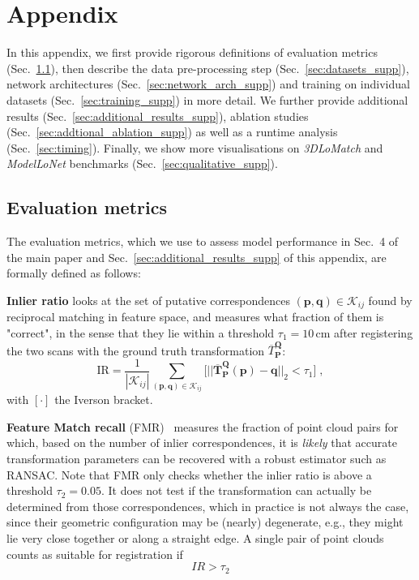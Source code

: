 \section{Appendix}
In this appendix, we first provide rigorous definitions of evaluation metrics (Sec.~\ref{sec:evaluation_metrics_supp}), then describe the data pre-processing step (Sec.~\ref{sec:datasets_supp}), network architectures (Sec.~\ref{sec:network_arch_supp}) and training on individual datasets (Sec.~\ref{sec:training_supp}) in more detail. We further provide additional results (Sec.~\ref{sec:additional_results_supp}), ablation studies (Sec.~\ref{sec:addtional_ablation_supp}) as well as a runtime analysis (Sec.~\ref{sec:timing}). Finally, we show more visualisations on \emph{3DLoMatch} and \emph{ModelLoNet} benchmarks (Sec.~\ref{sec:qualitative_supp}). 


\subsection{Evaluation metrics}
\label{sec:evaluation_metrics_supp}
The evaluation metrics, which we use to assess model performance in Sec.~4 of the main paper and Sec.~\ref{sec:additional_results_supp} of this appendix, are formally defined as follows:

\textbf{Inlier ratio} looks at the set of putative correspondences $(\mathbf{p}, \mathbf{q}) \in \mathcal{K}_{i j}$ found by reciprocal matching%
in feature space, and measures what fraction of them is "correct", in the sense that they lie within a threshold $\tau_1\!=\!10\,$cm after registering the two scans with the ground truth transformation $\overbar{T}_\mathbf{P}^ \mathbf{Q}$:
\begin{equation}
\mathrm{IR} = \frac{1}{\left|\mathcal{K}_{ij}\right|} \sum_{\left(\mathbf{p}, \mathbf{q}\right) \in \mathcal{K}_{ij}} \big[ ||\overbar{\mathbf{T}}_\mathbf{P}^ \mathbf{Q}(\mathbf{p})-\mathbf{q}||_2<\tau_{1} \big]  \;,
\end{equation}
with $[\cdot]$ the Iverson bracket.

\textbf{Feature Match recall} (FMR)~\cite{deng2018ppfnet} measures the fraction of point cloud pairs for which, based on the number of inlier correspondences, it is \emph{likely} that accurate transformation parameters can be recovered with a robust estimator such as RANSAC.
Note that FMR only checks whether the inlier ratio is above a threshold $\tau_2=0.05$. It does not test if the transformation can actually be determined from those correspondences, which in practice is not always the case, since their geometric configuration may be (nearly) degenerate, e.g., they might lie very close together or along a straight edge.
A single pair of point clouds counts as suitable for registration if%
\begin{equation}
    IR > \tau_2
\end{equation}

